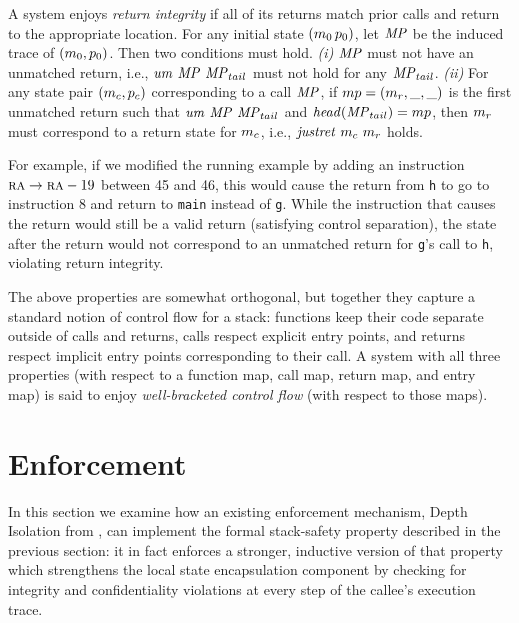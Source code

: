 \documentclass[acmsmall,review,anonymous]{acmart}\settopmatter{printfolios=true,printccs=false,printacmref=false}
\begin{document}
{%
A system enjoys {\em return integrity} if all of its returns match prior calls
and return to the appropriate location. For any initial state \((m_0\, p_0)\), let
\(\mathit{MP}\) be the induced trace of \((m_0,p_0)\). Then two
conditions must hold. 
\emph{(i)} \(\mathit{MP}\) must not have an unmatched return, i.e., \(\mathit{um} ~ \mathit{MP} ~ \mathit{MP}_{tail}\)
must not hold for any \(\mathit{MP}_{tail}\). \emph{(ii)} For any state pair \((m_c, p_c)\)
corresponding to a call \(\mathit{MP}\), if
\(mp = (m_r,\_,\_)\)
is the first unmatched return such that
\( \mathit{um} ~ \mathit{MP} ~ \mathit{MP}_{tail}\) and \(\mathit{head}{(\mathit{MP}_{tail})} = mp\),
then $m_r$ must correspond to a return state for $m_c$, i.e.,
\(\mathit{justret}\ m_c\ m_r\) holds.

For example, if we modified the running example by adding
an instruction $ \textsc{ra} \rightarrow \textsc{ra} - 19$
between 45 and 46, this would cause the return from {\tt h} to go to instruction 8 and
return to {\tt main} instead of {\tt g}. While the instruction that
causes the return would still be a valid return (satisfying control
separation), the state after the return would not correspond to an
unmatched return for {\tt g}'s call to {\tt h}, violating return
integrity.

The above properties are somewhat orthogonal, but together they
capture a standard notion of control flow for a stack: functions keep
their code separate outside of calls and returns, calls respect
explicit entry points, and returns respect implicit entry points
corresponding to their call.  A system with all three
properties (with respect to a function map, call map, return map,
and entry map) is said to enjoy
{\em well-bracketed control flow} (with respect to those maps).


\section{Enforcement}
\label{sec:enforcement}

In this section we examine how an existing enforcement mechanism,
Depth Isolation from \citet{DBLP:conf/sp/RoesslerD18}, can implement
the formal stack-safety property described in the previous section: it in
fact enforces a stronger, inductive version of that property which strengthens the
local state encapsulation component by checking for integrity and
confidentiality violations at every step of the callee's execution trace.

}
\end{document}
